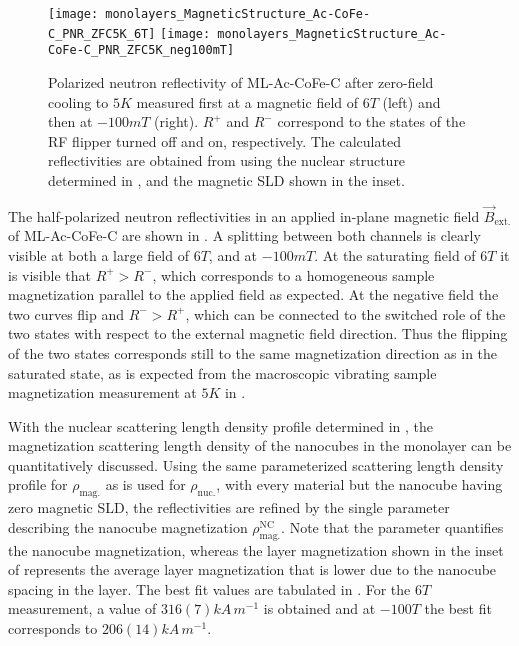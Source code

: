 \documentclass[\main/dresen_thesis.tex]{subfiles}
\begin{document}
  \begin{figure}[tb]
    \centering
    \texttt{[image: monolayers\_MagneticStructure\_Ac-CoFe-C\_PNR\_ZFC5K\_6T]}
    \texttt{[image: monolayers\_MagneticStructure\_Ac-CoFe-C\_PNR\_ZFC5K\_neg100mT]}
    \caption{\label{fig:monolayer:magneticStructure:pnr5K}Polarized neutron reflectivity of ML-Ac-CoFe-C after zero-field cooling to $5 \unit{K}$ measured first at a magnetic field of $6 \unit{T}$ (left) and then at $-100 \unit{mT}$ (right). $R^{+}$ and $R^{-}$ correspond to the states of the RF flipper turned off and on, respectively. The calculated reflectivities are obtained from using the nuclear structure determined in , and the magnetic SLD shown in the inset.}
  \end{figure}
  The half-polarized neutron reflectivities in an applied in-plane magnetic field $\vec{B}_\mathrm{ext.}$ of ML-Ac-CoFe-C are shown in .
  A splitting between both channels is clearly visible at both a large field of $6 \unit{T}$, and at $-100 \unit{mT}$.
  At the saturating field of $6 \unit{T}$ it is visible that $R^{+} > R^{-}$, which corresponds to a homogeneous sample magnetization parallel to the applied field as expected.
  At the negative field the two curves flip and $R^{-} > R^{+}$, which can be connected to the switched role of the two states with respect to the external magnetic field direction.
  Thus the flipping of the two states corresponds still to the same magnetization direction as in the saturated state, as is expected from the macroscopic vibrating sample magnetization measurement at $5 \unit{K}$ in .

  With the nuclear scattering length density profile determined in , the magnetization scattering length density of the nanocubes in the monolayer can be quantitatively discussed.
  Using the same parameterized scattering length density profile for $\rho_\mathrm{mag.}$ as is used for $\rho_\mathrm{nuc.}$, with every material but the nanocube having zero magnetic SLD, the reflectivities are refined by the single parameter describing the nanocube magnetization $\rho_\mathrm{mag.}^\mathrm{NC}$.
  Note that the parameter quantifies the nanocube magnetization, whereas the layer magnetization shown in the inset of  represents the average layer magnetization that is lower due to the nanocube spacing in the layer.
  The best fit values are tabulated in .
  For the $6 \unit{T}$ measurement, a value of $316(7) \unit{kA \, m^{-1}}$ is obtained and at $-100 \unit{T}$ the best fit corresponds to $206(14) \unit{kA \, m^{-1}}$.
\end{document}
